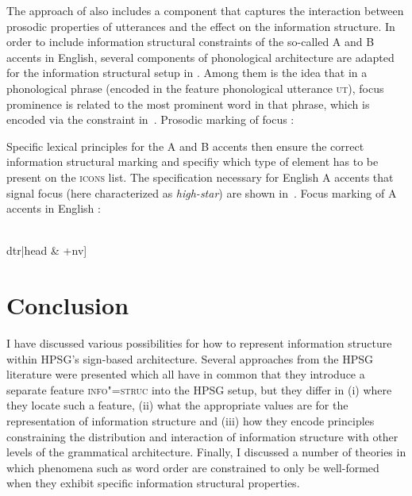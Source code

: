 \documentclass[output=paper
                ,modfonts
                ,nonflat
	        ,collection
	        ,collectionchapter
	        ,collectiontoclongg
 	        ,biblatex
                ,babelshorthands
                ,newtxmath
                ,draftmode
                ,colorlinks, citecolor=brown
]{./langsci/langscibook}
\begin{document}
The approach of \cite{song2018} also includes a component that
captures the interaction between prosodic properties of utterances and
the effect on the information structure. In order to include
information structural constraints of the so-called A and B accents in
English, several components of  phonological
architecture are adapted for the information structural setup in
\cite{song2018}. Among them is the idea that in a phonological phrase
(encoded in the feature phonological utterance \textsc{ut}), focus
prominence is related to the most prominent word in that phrase, which
is encoded via the constraint in~.
\ea
\label{ex:song-mkg}
Prosodic marking of focus \citep[159]{song2018}:\\
\begin{avm}
  
\end{avm}
\z
Specific lexical principles for the A and B accents then ensure the
correct information structural marking and specifiy which type of
element has to be present on the \textsc{icons} list. The
specification necessary for English A accents that signal focus (here characterized as
\textit{high-star}) are shown
in~.
\ea
\label{ex:song-a-accent}
Focus marking of A accents in English \citep[160]{song2018}:\\
 \impl
\begin{avm}
  [ut|dte & $+$\\
  pa & high-star\\
  mkg & fc-only\\
  index & @1\\
  incons-key & @2\\
  c-cont|icons &  \<\ \normalfont{!} @2[\tp{semantic-focus}\\target @1]\ \normalfont{!}\ \> \\
  dtr|head & +nv]
\end{avm}
\z

\section{Conclusion}
\label{sec:conclusion}

I have discussed various possibilities for how to represent
information structure within HPSG's sign-based architecture.
Several approaches from the HPSG literature were presented which all
have in common that they introduce a separate feature
\textsc{info"=struc} into the HPSG setup, but they differ in (i) where
they locate such a feature, (ii) what the appropriate values are for
the representation of information structure and (iii) how they encode
principles constraining the distribution and interaction of
information structure with other levels of the grammatical
architecture. Finally, I discussed a number of theories in which
phenomena such as word order are constrained to only be well-formed
when they exhibit specific information structural properties.
\end{document}
